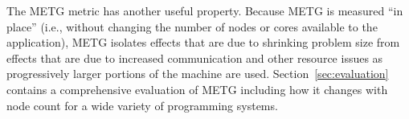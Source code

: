 The METG metric has another useful property. Because METG is measured ``in place'' (i.e.,
without changing the number of nodes or cores available to the
application), METG isolates effects that are
due to shrinking problem size from effects that are due to
increased communication and other resource issues as
progressively larger portions of the machine are used. Section~\ref{sec:evaluation} contains a comprehensive evaluation of
METG including how it changes with node count for a wide variety of
programming systems.
